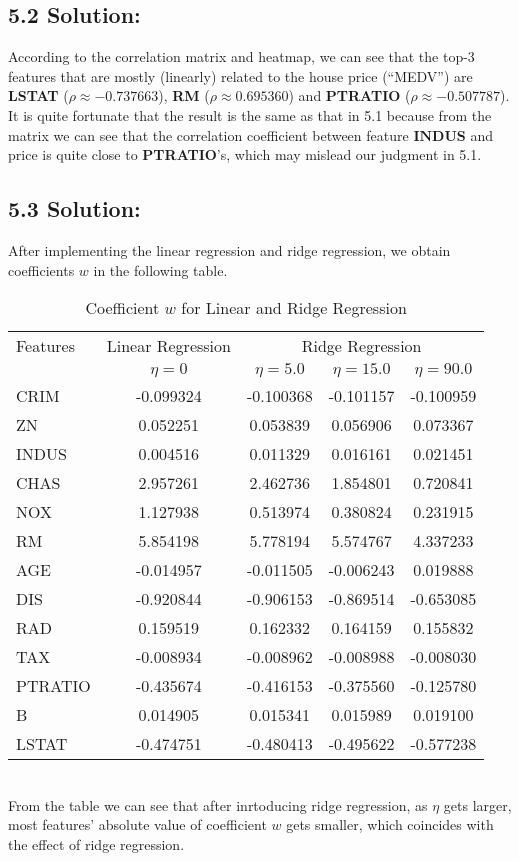 \documentclass{article}
\begin{document}
\subsection*{5.2 Solution:}
According to the correlation matrix and heatmap, we can see that the top-3 features that are mostly (linearly) related to the house price (“MEDV”) are
\textbf{LSTAT} ($\rho \approx -0.737663$), \textbf{RM} ($\rho \approx 0.695360$) and \textbf{PTRATIO} ($\rho \approx -0.507787$).
It is quite fortunate that the result is the same as that in 5.1 because from the matrix we can see that the correlation coefficient between feature $\textbf{INDUS}$ and price is quite close to \textbf{PTRATIO}'s, which may mislead our judgment in 5.1.

\subsection*{5.3 Solution:}
After implementing the linear regression and ridge regression, we obtain coefficients $w$ in the following table.
\begin{table}[h]
    \centering
    \caption{Coefficient $w$ for Linear and Ridge Regression}
    \label{tab:coefficients}
    \begin{tabular}{lcccc}
    \toprule
    Features & \multicolumn{1}{l}{Linear Regression} & \multicolumn{3}{c}{Ridge Regression} \\
    \cmidrule(r){2-2} \cmidrule(r){3-5}
     & $\eta = 0$ & $\eta = 5.0$ & $\eta = 15.0$ & $\eta = 90.0$ \\
    \midrule
    CRIM    & -0.099324 & -0.100368 & -0.101157 & -0.100959 \\
    ZN      & 0.052251  & 0.053839  & 0.056906  & 0.073367  \\
    INDUS   & 0.004516  & 0.011329  & 0.016161  & 0.021451  \\
    CHAS    & 2.957261  & 2.462736  & 1.854801  & 0.720841  \\
    NOX     & 1.127938  & 0.513974  & 0.380824  & 0.231915  \\
    RM      & 5.854198  & 5.778194  & 5.574767  & 4.337233  \\
    AGE     & -0.014957 & -0.011505 & -0.006243 & 0.019888  \\
    DIS     & -0.920844 & -0.906153 & -0.869514 & -0.653085 \\
    RAD     & 0.159519  & 0.162332  & 0.164159  & 0.155832  \\
    TAX     & -0.008934 & -0.008962 & -0.008988 & -0.008030 \\
    PTRATIO & -0.435674 & -0.416153 & -0.375560 & -0.125780 \\
    B       & 0.014905  & 0.015341  & 0.015989  & 0.019100  \\
    LSTAT   & -0.474751 & -0.480413 & -0.495622 & -0.577238 \\
    \bottomrule
    \end{tabular}
    \end{table}\\
From the table we can see that after inrtoducing ridge regression, as $\eta$ gets larger, most features' absolute value of coefficient $w$ gets smaller, which coincides with the effect of ridge regression.
\end{document}
